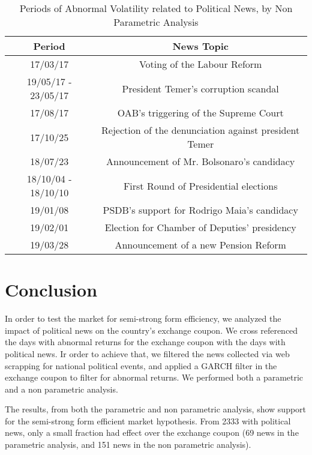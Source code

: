 \documentclass[cic,tc, english]{iiufrgs}
\begin{document}
    \begin{table}[H]
        \caption{Periods of Abnormal Volatility related to Political News, by Non Parametric Analysis}
        \label{tab:resnon}
        \centering
        \begin{tabular}{| c | c |}
            \hline
            Period & News Topic \\
            \hline \hline
            17/03/17 & Voting of the Labour Reform \\
            \hline
            19/05/17 - 23/05/17 & President Temer's corruption scandal \\
            \hline
            17/08/17 & OAB's triggering of the Supreme Court \\
            \hline
            17/10/25 & Rejection of the denunciation against president Temer \\
            \hline
            18/07/23 & Announcement of Mr. Bolsonaro's candidacy \\
            \hline
            18/10/04 - 18/10/10 & First Round of Presidential elections \\
            \hline
            19/01/08 & PSDB's support for Rodrigo Maia's candidacy \\
            \hline
            19/02/01 & Election for Chamber of Deputies' presidency \\
            \hline
            19/03/28 & Announcement of a new Pension Reform \\
            \hline
        \end{tabular}
    \end{table}

\chapter{Conclusion} \label{chapter_conclusion}

    In order to test the market for semi-strong form efficiency, we analyzed the impact of political news on the country's exchange coupon. We cross referenced the days with abnormal returns for the exchange coupon with the days with political news. Ir order to achieve that, we filtered the news collected via web scrapping for national political events, and applied a GARCH filter in the exchange coupon to filter for abnormal returns. We performed both a parametric and a non parametric analysis.

    The results, from both the parametric and non parametric analysis, show support for the semi-strong form efficient market hypothesis. From 2333 with political news, only a small fraction had effect over the exchange coupon (69 news in the parametric analysis, and 151 news in the non parametric analysis).
\end{document}
